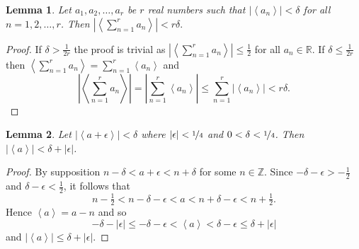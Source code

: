\documentclass[aap]{imsart}
\newcommand{\reals}{{\mathbb R}}
\newcommand{\ints}{{\mathbb Z}}
\newcommand{\fracpart}[1]{\left\langle #1 \right\rangle}
\newcommand{\abs}[1]{\left\vert #1 \right\vert}
\newtheorem{lemma}{Lemma}
\begin{document}
 \begin{lemma} \label{lem:fracpartsumanddelta}
 Let $a_1, a_2, \dots, a_r$ be $r$ real numbers such  that $\left|\fracpart{a_n}\right| < \delta$ for all $n = 1,2,\dots,r$.  Then $\left|\fracpart{\sum_{n=1}^r{a_n}}\right| < r\delta.$
 \end{lemma}
 \begin{proof}
 If $\delta > \tfrac{1}{2r}$ the proof is trivial as $\left|\fracpart{\sum_{n=1}^r{a_n}}\right| \leq \tfrac{1}{2}$ for all $a_n \in \reals$.  If $\delta \leq \tfrac{1}{2r}$ then $\fracpart{\sum_{n=1}^r{a_n}} = \sum_{n=1}^r{\fracpart{a_n}}$ and
 \[
 \left\vert\fracpart{\sum_{n=1}^r{a_n}}\right\vert = \left\vert\sum_{n=1}^r{\fracpart{a_n}}\right\vert \leq \sum_{n=1}^r{\left\vert\fracpart{a_n}\right\vert} < r\delta.
 \]
 \end{proof}


\begin{lemma} \label{lem:fracpartinternalsumlessdelta}
Let $\left|\fracpart{a + \epsilon}\right| < \delta$ where $|\epsilon| < \nicefrac{1}{4}$ and $0<\delta<\nicefrac{1}{4}$. Then $\left|\fracpart{a}\right| < \delta + |\epsilon|$.
\end{lemma}
\begin{proof}
By supposition $n - \delta < a + \epsilon < n + \delta$ for some $n \in \ints$.  Since $-\delta - \epsilon > -\tfrac{1}{2}$ and $\delta - \epsilon < \tfrac{1}{2}$, it follows that
\[
n - \tfrac{1}{2} < n - \delta - \epsilon < a < n + \delta - \epsilon < n + \tfrac{1}{2}.
\]
Hence $\fracpart{a} = a - n$ and so
\[
-\delta - \abs{\epsilon} \leq -\delta - \epsilon < \fracpart{a} < \delta - \epsilon \leq \delta + \abs{\epsilon}
\]
and $\abs{\fracpart{a}} \leq \delta + \abs{\epsilon}$.

\end{proof}
\end{document}
